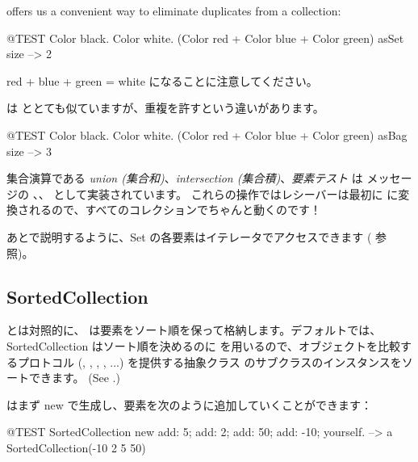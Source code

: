 \documentclass[a4paper,10pt,twoside]{book}
\begin{document}
 offers us a convenient way to eliminate duplicates from a collection:
\begin{code}{@TEST}
{ Color black. Color white. (Color red + Color blue + Color green) } asSet size --> 2
\end{code}
\noindent
red + blue + green = white になることに注意してください。

 は  ととても似ていますが、重複を許すという違いがあります。
\begin{code}{@TEST}
{ Color black. Color white. (Color red + Color blue + Color green) } asBag size --> 3
\end{code}

集合演算である \emph{union (集合和)}、\emph{intersection (集合積)}、\emph{要素テスト} は  メッセージの 、、 として実装されています。
これらの操作ではレシーバーは最初に  に変換されるので、すべてのコレクションでちゃんと動くのです！


あとで説明するように、Set の各要素はイテレータでアクセスできます ( 参照)。

\subsection{SortedCollection}
 とは対照的に、 は要素をソート順を保って格納します。デフォルトでは、SortedCollection はソート順を決めるのに  を用いるので、オブジェクトを比較するプロトコル (, , , , ...) を提供する抽象クラス  のサブクラスのインスタンスをソートできます。
(See .)

 はまず new で生成し、要素を次のように追加していくことができます：
\begin{code}{@TEST}
SortedCollection new add: 5; add: 2; add: 50; add: -10; yourself. --> a SortedCollection(-10 2 5 50)
\end{code}
\end{document}
